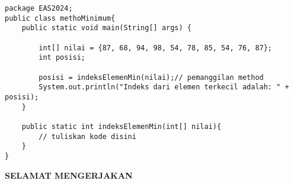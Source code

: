 \documentclass[10pt,openany,letterpaper]{article}
\begin{document}
\begin{enumerate}
\begin{verbatim}
package EAS2024;
public class methoMinimum{
    public static void main(String[] args) {
        
        int[] nilai = {87, 68, 94, 98, 54, 78, 85, 54, 76, 87};
        int posisi;

        posisi = indeksElemenMin(nilai);// pemanggilan method
        System.out.println("Indeks dari elemen terkecil adalah: " + posisi);
    }

    public static int indeksElemenMin(int[] nilai){
        // tuliskan kode disini
    } 
}
    \end{verbatim}
\end{enumerate}
\begin{center}
    \textbf{SELAMAT MENGERJAKAN}
\end{center}

\newpage
{}
\end{document}
